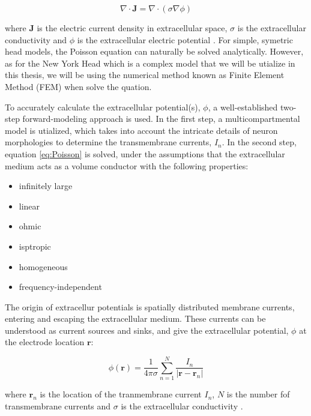 \documentclass[a4paper, UKenglish, 11pt]{uiomaster}
\begin{document}
\begin{equation}
  \nabla \cdot \textbf{J} = \nabla \cdot \left(\sigma \nabla \phi \right)
\label{eq:Poisson}
\end{equation}

where \textbf{J} is the electric current density in extracellular space, $\sigma$ is the extracellular conductivity and $\phi$ is the extracellular electric potential \cite{naess2021biophysically}. For simple, symetric head models, the Poisson equation can naturally be solved analytically. However, as for the New York Head which is a complex model that we will be utialize in this thesis, we will be using the numerical method known as Finite Element Method (FEM) when solve the quation.


To accurately calculate the extracellular potential(s), $\phi$, a well-established two-step forward-modeling approach is used. In the first step, a multicompartmental model is utialized, which takes into account the intricate details of neuron morphologies to determine the transmembrane currents, $I_n$. In the second step, equation \ref{eq:Poisson} is solved, under the assumptions that the extracellular medium acts as a volume conductor with the following properties:

\begin{itemize}
    \item infinitely large
    \item linear
    \item ohmic
    \item isptropic
    \item homogeneous
    \item frequency-independent
\end{itemize}

The origin of extracellur potentials is spatially distributed membrane currents, entering and escaping the extracellular medium. These currents can be understood as current sources and sinks, and give the extracellular potential, $\phi$ at the electrode location $\textbf{r}$:

\begin{equation}
  \phi(\textbf{r}) = \frac{1}{4\pi\sigma}\sum^{N}_{n=1}\frac{I_n}{|\textbf{r}-\textbf{r}_n|}
\label{eq:extracellular_potential}
\end{equation}

where $\textbf{r}_n$ is the location of the tranmembrane current $I_n$, $N$ is the number fof transmembrane currents and $\sigma$ is the extracellular conductivity \cite{naess2021biophysically}.
\end{document}
